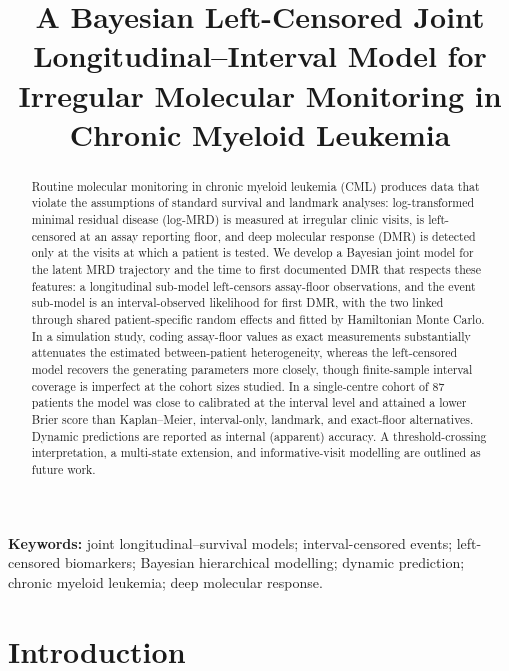 \documentclass[11pt]{article}
\title{A Bayesian Left-Censored Joint Longitudinal--Interval Model for
Irregular Molecular Monitoring in Chronic Myeloid Leukemia}
\author{}     %
\date{}
\begin{document}
\maketitle

\begin{abstract}
Routine molecular monitoring in chronic myeloid leukemia (CML) produces
data that violate the assumptions of standard survival and landmark
analyses: log-transformed minimal residual disease (log-MRD) is measured
at irregular clinic visits, is left-censored at an assay reporting floor,
and deep molecular response (DMR) is detected only at the visits at which a
patient is tested. We develop a Bayesian joint model for the latent MRD
trajectory and the time to first documented DMR that respects these
features: a longitudinal sub-model left-censors assay-floor observations,
and the event sub-model is an interval-observed likelihood for first DMR,
with the two linked through shared patient-specific random effects and
fitted by Hamiltonian Monte Carlo. In a simulation study, coding
assay-floor values as exact measurements substantially attenuates the
estimated between-patient heterogeneity, whereas the left-censored model
recovers the generating parameters more closely, though finite-sample
interval coverage is imperfect at the cohort sizes studied. In a single-centre cohort of 87 patients the model was close to
calibrated at the interval level and attained a lower Brier score than
Kaplan--Meier, interval-only, landmark, and exact-floor alternatives.
Dynamic predictions are reported as internal (apparent) accuracy. A threshold-crossing
interpretation, a multi-state extension, and informative-visit modelling are
outlined as future work.
\end{abstract}

\noindent\textbf{Keywords:} joint longitudinal--survival models;
interval-censored events; left-censored biomarkers; Bayesian hierarchical
modelling; dynamic prediction; chronic myeloid leukemia; deep molecular
response.

\section{Introduction}
\end{document}
